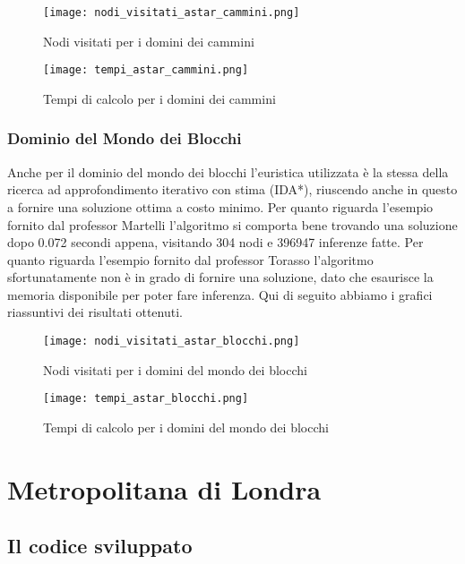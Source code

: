 \begin{figure}[!htp]
  \centering
  \texttt{[image: nodi\_visitati\_astar\_cammini.png]}
  \caption{Nodi visitati per i domini dei cammini}
  \label{fig:figure13}
\end{figure}

\begin{figure}[!htp]
  \centering
  \texttt{[image: tempi\_astar\_cammini.png]}
  \caption{Tempi di calcolo per i domini dei cammini}
  \label{fig:figure14}
\end{figure}

\subsection{Dominio del Mondo dei Blocchi}

Anche per il dominio del mondo dei blocchi l'euristica utilizzata è la stessa della ricerca ad approfondimento iterativo con stima (IDA*), riuscendo anche in questo a fornire una soluzione ottima a costo minimo. Per quanto riguarda l'esempio fornito dal professor Martelli l'algoritmo si comporta bene trovando una soluzione dopo 0.072 secondi appena, visitando 304 nodi e 396947 inferenze fatte.
Per quanto riguarda l'esempio fornito dal professor Torasso l'algoritmo sfortunatamente non è in grado di fornire una soluzione, dato che esaurisce la memoria disponibile per poter fare inferenza.
Qui di seguito abbiamo i grafici riassuntivi dei risultati ottenuti.

\begin{figure}[htp]
  \texttt{[image: nodi\_visitati\_astar\_blocchi.png]}
  \caption{Nodi visitati per i domini del mondo dei blocchi}
  \label{fig:figure15}
\end{figure}

\begin{figure}[htp]
  \texttt{[image: tempi\_astar\_blocchi.png]}
  \caption{Tempi di calcolo per i domini del mondo dei blocchi}
  \label{fig:figure16}
\end{figure}

\chapter{Metropolitana di Londra}

\section{Il codice sviluppato}

